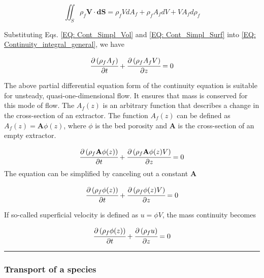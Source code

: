 \documentclass[../Article_Model_Parameters.tex]{subfiles}
\begin{document}
	{\footnotesize
		\begin{equation}
			\iint_S \rho_f \textbf{V} \cdot \textbf{dS} = \rho_f V dA_f + \rho_f A_f dV + V A_f d\rho_f 
			\label{EQ: Cont_Simpl_Surf}
		\end{equation}
	}

	Substituting Eqs. \ref{EQ: Cont_Simpl_Vol} and \ref{EQ: Cont_Simpl_Surf} into \ref{EQ: Continuity_integral_general}, we have
	
	{\footnotesize
		\begin{equation}
			\cfrac{\partial \left( \rho_f A_f \right)}{\partial t} + \cfrac{\partial \left( \rho_f A_f V \right)}{\partial z} = 0
			\label{EQ: Conservative_continuity}
		\end{equation}
	}
	
	The above partial differential equation form of the continuity equation is suitable for unsteady, quasi-one-dimensional flow. It ensures that mass is conserved for this mode of flow. The $A_f(z)$ is an arbitrary function that describes a change in the cross-section of an extractor. The function $A_f(z)$ can be defined as $A_f(z) = \textbf{A} \phi(z)$, where $\phi$ is the bed porosity and $\textbf{A}$ is the cross-section of an empty extractor.
	
	{\footnotesize
		\begin{equation}
			\cfrac{\partial \left( \rho_f \textbf{A} \phi (z) \right)}{\partial t} + \cfrac{\partial \left( \rho_f \textbf{A} \phi (z) V \right)}{\partial z} = 0
		\end{equation}
	}
	The equation can be simplified by canceling out a constant $\textbf{A}$
	
	{\footnotesize
		\begin{equation}
			\cfrac{\partial \left( \rho_f \phi (z) \right)}{\partial t} + \cfrac{\partial \left( \rho_f \phi (z) V \right)}{\partial z} = 0
		\end{equation}
	}
	
	If so-called superficial velocity is defined as $u=\phi V$, the mass continuity becomes
	
	{\footnotesize
		\begin{equation}
			\cfrac{\partial \left( \rho_f \phi (z) \right)}{\partial t} + \cfrac{\partial \left( \rho_f u \right)}{\partial z} = 0
			\label{EQ: Mass_Continuity}
		\end{equation}
	}
	
	\hrule
	
	\subsubsection{Transport of a species}
	
\end{document}

